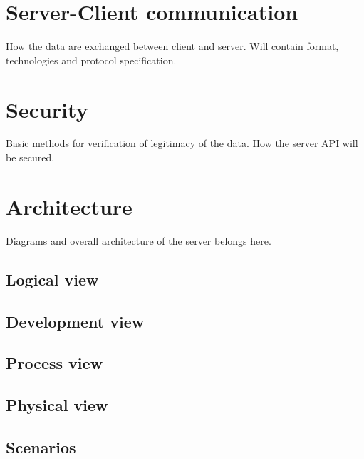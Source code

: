 \section{Server-Client communication}
How the data are exchanged between client and server. Will contain format, technologies and protocol specification. 

\section{Security}
Basic methods for verification of legitimacy of the data. How the server API will be secured.

\section{Architecture}
Diagrams and overall architecture of the server belongs here.

	\subsection{Logical view}
	
	\subsection{Development view}
	
	\subsection{Process view}
	
	\subsection{Physical view}
	
	\subsection{Scenarios}